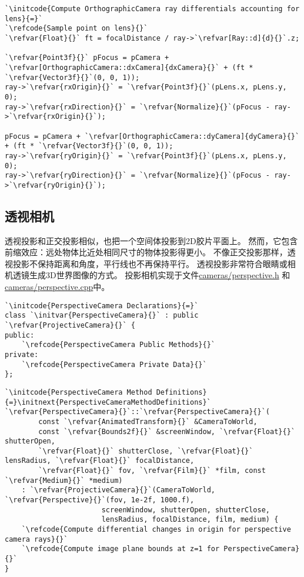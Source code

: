 \begin{lstlisting}
`\initcode{Compute OrthographicCamera ray differentials accounting for lens}{=}`
`\refcode{Sample point on lens}{}`
`\refvar{Float}{}` ft = focalDistance / ray->`\refvar[Ray::d]{d}{}`.z;

`\refvar{Point3f}{}` pFocus = pCamera + `\refvar[OrthographicCamera::dxCamera]{dxCamera}{}` + (ft * `\refvar{Vector3f}{}`(0, 0, 1));
ray->`\refvar{rxOrigin}{}` = `\refvar{Point3f}{}`(pLens.x, pLens.y, 0);
ray->`\refvar{rxDirection}{}` = `\refvar{Normalize}{}`(pFocus - ray->`\refvar{rxOrigin}{}`);

pFocus = pCamera + `\refvar[OrthographicCamera::dyCamera]{dyCamera}{}` + (ft * `\refvar{Vector3f}{}`(0, 0, 1));
ray->`\refvar{ryOrigin}{}` = `\refvar{Point3f}{}`(pLens.x, pLens.y, 0);
ray->`\refvar{ryDirection}{}` = `\refvar{Normalize}{}`(pFocus - ray->`\refvar{ryOrigin}{}`);
\end{lstlisting}

\subsection{透视相机}\label{sub:透视相机}
透视投影和正交投影相似，也把一个空间体投影到2D胶片平面上。
然而，它包含前缩效应：远处物体比近处相同尺寸的物体投影得更小。
不像正交投影那样，透视投影不保持距离和角度，平行线也不再保持平行。
透视投影非常符合眼睛或相机透镜生成3D世界图像的方式。
投影相机实现于文件\href{https://github.com/mmp/pbrt-v3/blob/master/src/cameras/perspective.h}{\ttfamily cameras/perspective.h}
和\href{https://github.com/mmp/pbrt-v3/blob/master/src/cameras/perspective.cpp}{\ttfamily cameras/perspective.cpp}中。
\begin{lstlisting}
`\initcode{PerspectiveCamera Declarations}{=}`
class `\initvar{PerspectiveCamera}{}` : public `\refvar{ProjectiveCamera}{}` {
public:
    `\refcode{PerspectiveCamera Public Methods}{}`
private:
    `\refcode{PerspectiveCamera Private Data}{}`
};
\end{lstlisting}
\begin{lstlisting}
`\initcode{PerspectiveCamera Method Definitions}{=}\initnext{PerspectiveCameraMethodDefinitions}`
`\refvar{PerspectiveCamera}{}`::`\refvar{PerspectiveCamera}{}`(
        const `\refvar{AnimatedTransform}{}` &CameraToWorld,
        const `\refvar{Bounds2f}{}` &screenWindow, `\refvar{Float}{}` shutterOpen,
        `\refvar{Float}{}` shutterClose, `\refvar{Float}{}` lensRadius, `\refvar{Float}{}` focalDistance,
        `\refvar{Float}{}` fov, `\refvar{Film}{}` *film, const `\refvar{Medium}{}` *medium)
    : `\refvar{ProjectiveCamera}{}`(CameraToWorld, `\refvar{Perspective}{}`(fov, 1e-2f, 1000.f),
                       screenWindow, shutterOpen, shutterClose,
                       lensRadius, focalDistance, film, medium) {
    `\refcode{Compute differential changes in origin for perspective camera rays}{}`
    `\refcode{Compute image plane bounds at z=1 for PerspectiveCamera}{}`
}
\end{lstlisting}

